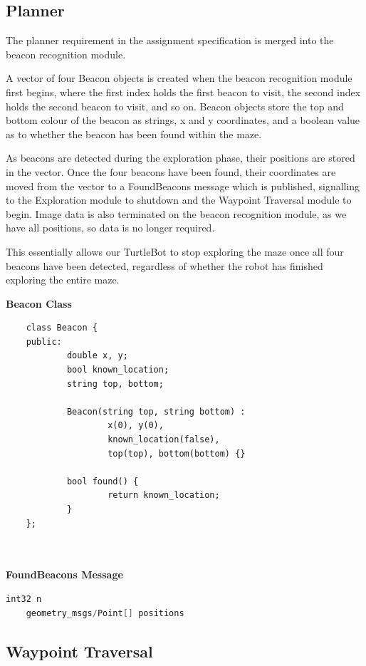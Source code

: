 \documentclass[titlepage,12pt,a4paper]{article}
\begin{document}
\pagebreak
\subsection{Planner}

The planner requirement in the assignment specification is merged into the beacon recognition module.

A vector of four Beacon objects is created when the beacon recognition module first begins, where the first index holds the first beacon to visit, the second index holds the second beacon to visit, and so on. Beacon objects store the top and bottom colour of the beacon as strings, x and y coordinates, and a boolean value as to whether the beacon has been found within the maze. 

As beacons are detected during the exploration phase, their positions are stored in the vector. Once the four beacons have been found, their coordinates are moved from the vector to a FoundBeacons message which is published, signalling to the Exploration module to shutdown and the Waypoint Traversal module to begin. Image data is also terminated on the beacon recognition module, as we have all positions, so data is no longer required.

This essentially allows our TurtleBot to stop exploring the maze once all four beacons have been detected, regardless of whether the robot has finished exploring the entire maze.

\textbf{Beacon Class}
\begin{lstlisting}
	class Beacon {
	public:
    		double x, y;
    		bool known_location;
    		string top, bottom;

    		Beacon(string top, string bottom) :
        			x(0), y(0),
        			known_location(false),
        			top(top), bottom(bottom) {}

    		bool found() {
        			return known_location;
    		}
	};
	
\end{lstlisting}

\textbf{\\FoundBeacons Message}
\begin{lstlisting}[language=C++]
	int32 n
	geometry_msgs/Point[] positions
\end{lstlisting}

\pagebreak
\subsection{Waypoint Traversal}
\end{document}
